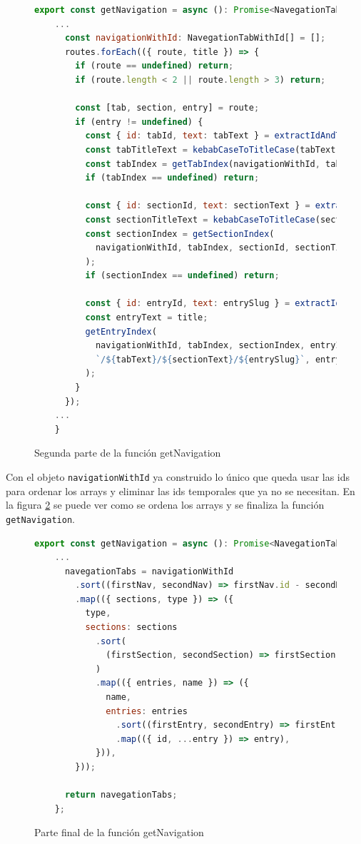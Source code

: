 \begin{figure}
    \begin{lstlisting}[language=Javascript]
    export const getNavigation = async (): Promise<NavegationTab[]> => {
    ...
      const navigationWithId: NavegationTabWithId[] = [];
      routes.forEach(({ route, title }) => {
        if (route == undefined) return;
        if (route.length < 2 || route.length > 3) return;
    
        const [tab, section, entry] = route;
        if (entry != undefined) {
          const { id: tabId, text: tabText } = extractIdAndText(tab);
          const tabTitleText = kebabCaseToTitleCase(tabText);
          const tabIndex = getTabIndex(navigationWithId, tabId, tabTitleText);
          if (tabIndex == undefined) return;
    
          const { id: sectionId, text: sectionText } = extractIdAndText(section);
          const sectionTitleText = kebabCaseToTitleCase(sectionText);
          const sectionIndex = getSectionIndex(
            navigationWithId, tabIndex, sectionId, sectionTitleText
          );
          if (sectionIndex == undefined) return;
    
          const { id: entryId, text: entrySlug } = extractIdAndText(entry);
          const entryText = title;
          getEntryIndex(
            navigationWithId, tabIndex, sectionIndex, entryId,
            `/${tabText}/${sectionText}/${entrySlug}`, entryText
          );
        }
      });
    ...
    }
    \end{lstlisting}
    \caption{Segunda parte de la función getNavigation}
    \label{fig:getNavigation2}
\end{figure}

Con el objeto \verb|navigationWithId| ya construido lo único que queda usar las ids para ordenar los arrays y eliminar las ids temporales que ya no se necesitan. En la figura \ref{fig:getNavigation3} se puede ver como se ordena los arrays y se finaliza la función \verb|getNavigation|.

\begin{figure}
    \begin{lstlisting}[language=Javascript]
    export const getNavigation = async (): Promise<NavegationTab[]> => {
    ...
      navegationTabs = navigationWithId
        .sort((firstNav, secondNav) => firstNav.id - secondNav.id)
        .map(({ sections, type }) => ({
          type,
          sections: sections
            .sort(
              (firstSection, secondSection) => firstSection.id - secondSection.id
            )
            .map(({ entries, name }) => ({
              name,
              entries: entries
                .sort((firstEntry, secondEntry) => firstEntry.id - secondEntry.id)
                .map(({ id, ...entry }) => entry),
            })),
        }));

      return navegationTabs;
    };
    \end{lstlisting}
    \caption{Parte final de la función getNavigation}
    \label{fig:getNavigation3}
\end{figure}

